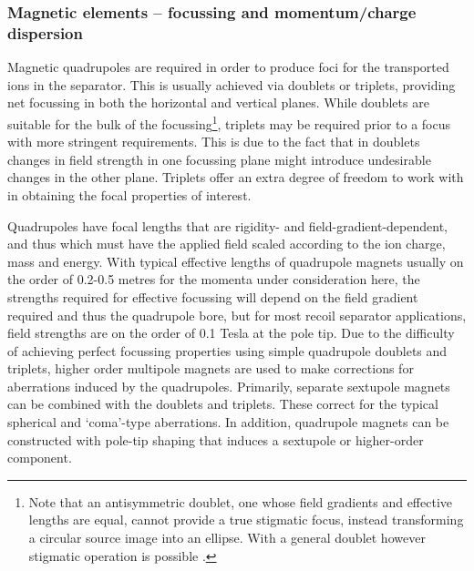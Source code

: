 \subsubsection{Magnetic elements -- focussing and momentum/charge dispersion}\label{magel}


Magnetic quadrupoles are required in order to produce foci for the transported ions in the separator. This is usually achieved via doublets or triplets, providing net focussing in both the horizontal and vertical planes. While doublets are suitable for the bulk of the focussing\footnote{Note that an antisymmetric doublet, one whose field gradients and effective lengths are equal, cannot provide a true stigmatic focus, instead transforming a circular source image into an ellipse. With a general doublet however stigmatic operation is possible \cite{reg67}.}, triplets may be required prior to a focus with more stringent requirements. This is due to the fact that in doublets changes in field strength in one focussing plane might introduce undesirable changes in the other plane. Triplets offer an extra degree of freedom to work with in obtaining the focal properties of interest.  

Quadrupoles have focal lengths that are rigidity- and field-gradient-dependent, and thus which must have the applied field scaled according to the ion charge, mass and energy.  With typical effective lengths of quadrupole magnets usually on the order of 0.2-0.5 metres for the momenta under consideration here, the strengths required for effective focussing will depend on the field gradient required and thus the quadrupole bore, but for most recoil separator applications, field strengths are on the order of 0.1 Tesla at the pole tip. Due to the difficulty of achieving perfect focussing properties using simple quadrupole doublets and triplets, higher order multipole magnets are used to make corrections for aberrations induced by the quadrupoles. Primarily, separate sextupole magnets can be combined with the doublets and triplets. These correct for the typical spherical and `coma'-type aberrations. In addition, quadrupole magnets can be constructed with pole-tip shaping that induces a sextupole or higher-order component.  

